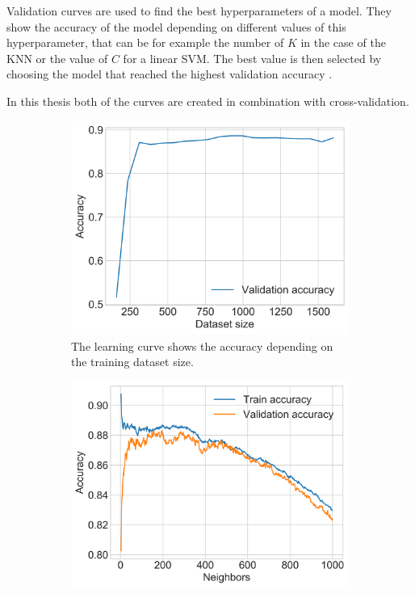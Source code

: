 Validation curves are used to find the best hyperparameters of a model.
They show the accuracy of the model depending on different values of this hyperparameter, that can be for example the number of $K$ in the case of the \ac{KNN} or the value of $C$ for a linear \ac{SVM}.
The best value is then selected by choosing the model that reached the highest validation accuracy \cite[p. 711]{Russel2016}.

In this thesis both of the curves are created in combination with cross-validation.
\begin{figure}[h]
    \begin{subfigure}{0.5\textwidth}
        \includegraphics[width=\textwidth]{figures/knn_sample_learning_curve.png}
        \caption{The learning curve shows the accuracy depending on the training dataset size.}
        \label{figure:sample_learning_curve}
    \end{subfigure}
    \begin{subfigure}{0.5\textwidth}
        \includegraphics[width=\textwidth]{figures/knn_sample_validation_curve.png}

\end{subfigure}
\end{figure}
